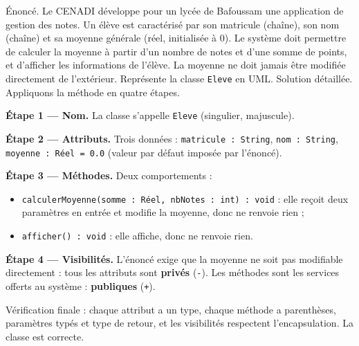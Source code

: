 \documentclass[11pt]{article}
\begin{document}
\begin{exoresolu}
Énoncé. Le CENADI développe pour un lycée de Bafoussam une application de gestion des notes. Un élève est caractérisé par son matricule (chaîne), son nom (chaîne) et sa moyenne générale (réel, initialisée à 0). Le système doit permettre de calculer la moyenne à partir d'un nombre de notes et d'une somme de points, et d'afficher les informations de l'élève. La moyenne ne doit jamais être modifiée directement de l'extérieur. Représente la classe \texttt{Eleve} en UML.
\tcblower
Solution détaillée. Appliquons la méthode en quatre étapes.

\textbf{Étape 1 — Nom.} La classe s'appelle \texttt{Eleve} (singulier, majuscule).

\textbf{Étape 2 — Attributs.} Trois données : \texttt{matricule : String}, \texttt{nom : String}, \texttt{moyenne : R\'eel = 0.0} (valeur par défaut imposée par l'énoncé).

\textbf{Étape 3 — Méthodes.} Deux comportements :
\begin{itemize}
\item \texttt{calculerMoyenne(somme : R\'eel, nbNotes : int) : void} : elle reçoit deux paramètres en entrée et modifie la moyenne, donc ne renvoie rien ;
\item \texttt{afficher() : void} : elle affiche, donc ne renvoie rien.
\end{itemize}

\textbf{Étape 4 — Visibilités.} L'énoncé exige que la moyenne ne soit pas modifiable directement : tous les attributs sont \textbf{privés} (\texttt{-}). Les méthodes sont les services offerts au système : \textbf{publiques} (\texttt{+}).

\begin{center}
\end{center}

Vérification finale : chaque attribut a un type, chaque méthode a parenthèses, paramètres typés et type de retour, et les visibilités respectent l'encapsulation. La classe est correcte.
\end{exoresolu}
\end{document}
